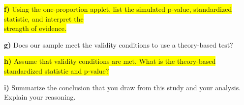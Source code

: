 \documentclass{article}
\newif\ifPrintSolution
\newcommand{\sol}[1]{\ifPrintSolution {\color{blue} #1 } \fi}
\begin{document}
\sol{$\hat{p} = \frac{14}{28} = 0.5$\\
\textit{n} = 28}

\vspace{0.25in}

\hspace{0.1in}\colorbox{yellow}{\textbf{f) }Using the one-proportion applet, list the simulated p-value, standardized statistic, and interpret the}\\ \colorbox{yellow}{strength of evidence.}

\sol{Answers may vary.\\
p-value = 0.003; This is the probability of observing a result at least as extreme as 14/28 assuming our null hypothesis is true.\\
z = 3.125. The observed result of 0.5 is 3.125 standard deviations above the hypothesized long-run proportion of 0.25\\
Both of these indicate very strong strength of evidence against the null hypothesis that the long run proportion of cadets who choose front right is $\frac{1}{4}$.}

\vspace{0.25in}

\hspace{0.1in} \textbf{g) }Does our sample meet the validity conditions to use a theory-based test?

\sol{Yes, we have 14 successes and 14 failures, both of which are above 10}

\vspace{0.25in}

\hspace{0.1in} \colorbox{yellow}{\textbf{h) }Assume that validity conditions are met. What is the theory-based standardized statistic  and p-value?}

\sol{z = $\frac{0.5 - 0.25}{\sqrt{\frac{0.25 \times (1 - 0.25)}{28}}}$ = 3.05505\\
p-value = 1 - pnorm(3.05505) = 0.001125}

\vspace{0.25in}

\hspace{0.1in} \textbf{i) } Summarize the conclusion that you draw from this study and your analysis. Explain your reasoning.

\sol{We have very strong evidence that cadets choose the right front tire more than 25$\%$ of the time. Through simulation, we would only expect to see our observation of $\frac{14}{28}$ about 1$\%$ of the time if the true long-run proportion of this process was 0.25.}
\end{document}
